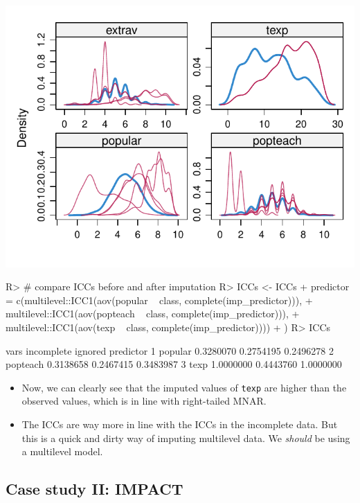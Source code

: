 \documentclass[
]{jss}
\begin{document}
\begin{CodeChunk}
\begin{center}\includegraphics{Manuscript_files/figure-latex/pop-predictor-3} \end{center}

\begin{CodeInput}
R> # compare ICCs before and after imputation
R> ICCs <- ICCs %
+            predictor = c(multilevel::ICC1(aov(popular ~ class, complete(imp_predictor))), 
+                         multilevel::ICC1(aov(popteach ~ class, complete(imp_predictor))), 
+                         multilevel::ICC1(aov(texp ~ class, complete(imp_predictor))))
+            )
R> ICCs
\end{CodeInput}
\begin{CodeOutput}
      vars incomplete   ignored predictor
1  popular  0.3280070 0.2754195 0.2496278
2 popteach  0.3138658 0.2467415 0.3483987
3     texp  1.0000000 0.4443760 1.0000000
\end{CodeOutput}
\end{CodeChunk}

\begin{itemize}
\item
  Now, we can clearly see that the imputed values of \texttt{texp} are
  higher than the observed values, which is in line with right-tailed
  MNAR.
\item
  The ICCs are way more in line with the ICCs in the incomplete data.
  But this is a quick and dirty way of imputing multilevel data. We
  \emph{should} be using a multilevel model.
\end{itemize}

\hypertarget{case-study-ii-impact}{%
\subsection{Case study II: IMPACT}\label{case-study-ii-impact}}
\end{document}
